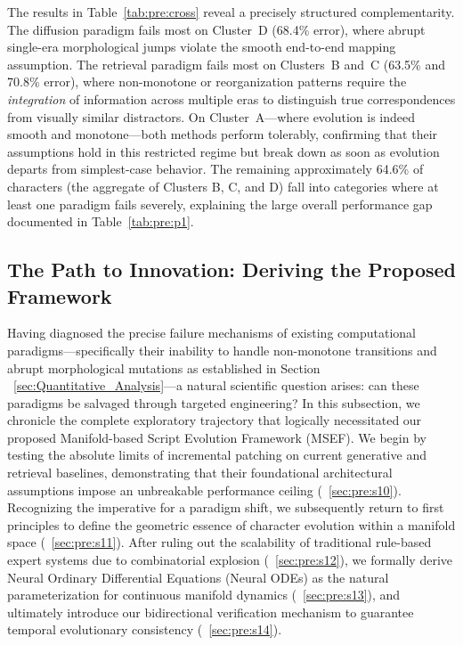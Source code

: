 \documentclass{article}
\begin{document}
The results in Table~\ref{tab:pre:cross} reveal a precisely structured complementarity. The diffusion paradigm fails most on Cluster~D (68.4\% error), where abrupt single-era morphological jumps violate the smooth end-to-end mapping assumption. The retrieval paradigm fails most on Clusters~B and~C (63.5\% and 70.8\% error), where non-monotone or reorganization patterns require the \emph{integration} of information across multiple eras to distinguish true correspondences from visually similar distractors. On Cluster~A—where evolution is indeed smooth and monotone—both methods perform tolerably, confirming that their assumptions hold in this restricted regime but break down as soon as evolution departs from simplest-case behavior. The remaining approximately 64.6\% of characters (the aggregate of Clusters B, C, and D) fall into categories where at least one paradigm fails severely, explaining the large overall performance gap documented in Table~\ref{tab:pre:p1}.


\subsection{The Path to Innovation: Deriving the Proposed Framework}

Having diagnosed the precise failure mechanisms of existing computational paradigms—specifically their inability to handle non-monotone transitions and abrupt morphological mutations as established in Section ~\ref{sec:Quantitative_Analysis}—a natural scientific question arises: can these paradigms be salvaged through targeted engineering? In this subsection, we chronicle the complete exploratory trajectory that logically necessitated our proposed Manifold-based Script Evolution Framework (MSEF). We begin by testing the absolute limits of incremental patching on current generative and retrieval baselines, demonstrating that their foundational architectural assumptions impose an unbreakable performance ceiling (~\ref{sec:pre:s10}). Recognizing the imperative for a paradigm shift, we subsequently return to first principles to define the geometric essence of character evolution within a manifold space (~\ref{sec:pre:s11}). After ruling out the scalability of traditional rule-based expert systems due to combinatorial explosion (~\ref{sec:pre:s12}), we formally derive Neural Ordinary Differential Equations (Neural ODEs) as the natural parameterization for continuous manifold dynamics (~\ref{sec:pre:s13}), and ultimately introduce our bidirectional verification mechanism to guarantee temporal evolutionary consistency (~\ref{sec:pre:s14}).
\end{document}
